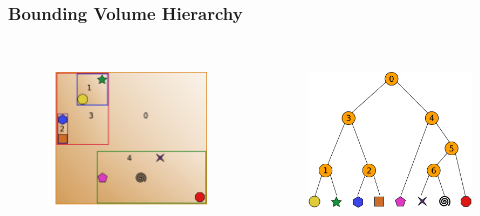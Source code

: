 \documentclass{beamer}
\begin{document}
\begin{frame}
  \frametitle{Bounding Volume Hierarchy}
  
\begin{columns}[t]

\begin{figure}
\includegraphics[height=45mm]{build2.png}
\end{figure}

\begin{figure}
\includegraphics[height=45mm]{primitive_tree_narrow.png}
\end{figure}
\end{columns}
\end{frame}
\end{document}
